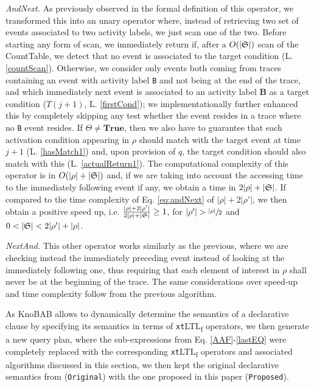 \documentclass[sigconf]{acmart}
\begin{document}
\textit{AndNext.} As previously observed in the formal definition of this operator, we transformed this into an unary operator where, instead of retrieving two set of events associated to two activity labels, we just scan one of the two. Before starting any form of scan, we immediately return if, after a $O(|\mathfrak{S}|)$ scan of the CountTable, we detect that no event is associated to the target condition (L. \ref{countScan}). Otherwise, we consider only events both coming from traces containing an event with  activity label \texttt{B} and not being at the end of the trace, and which immediately next event is associated to an activity label \textbf{B} as a target condition ($T(j+1)$, L. \ref{firstCond}); we implementationally further enhanced this by completely skipping any test whether the event resides in a trace where no \texttt{B} event resides. If $\Theta\neq\textbf{True}$, then we also have to guarantee that each activation condition appearing in $\rho$ should match with the target event at time $j+1$ (L. \ref{hasMatch1}) and, upon provision of $q$, the target condition should also match with this (L. \ref{actualReturn1}). The computational complexity of this operator is in $O(|\rho|+|\mathfrak{S}|)$ and, if we are taking into account the accessing time to the immediately following event if any, we obtain a time in $2|\rho|+|\mathfrak{S}|$. If compared to the time complexity of Eq. \ref{eq:andNext} of $|\rho|+2|\rho'|$, we then obtain a positive speed up, i.e. $\frac{|\rho|+2|\rho'|}{2|\rho|+|\mathfrak{S}|}\geq 1$, for $|\rho'|>\sfrac{|\rho|}{2}$ and $0<|\LOG|<2|\rho'|+|\rho|$.  \medskip

\textit{NextAnd.} This other operator works similarly as the previous, where we are checking instead the immediately preceding event instead of looking at the immediately following one, thus requiring that each element of interest in $\rho$ shall never be at the beginning of the trace. The same considerations over speed-up and time complexity follow from the previous algorithm. %
\medskip

As KnoBAB allows to dynamically determine the semantics of a declarative clause by specifying its semantics in terms of \texttt{xt}LTL\textsubscript{f} operators, we then generate a new query plan, where the sub-expressions from Eq. \ref{AAF}-\ref{lastEQ} were completely replaced with the corresponding \texttt{xt}LTL\textsubscript{f} operators and associated algorithms discussed in this section, we then kept the original declarative semantics from \cite{info14030173} (\texttt{Original}) with the one proposed in this paper (\texttt{Proposed}).
\end{document}
